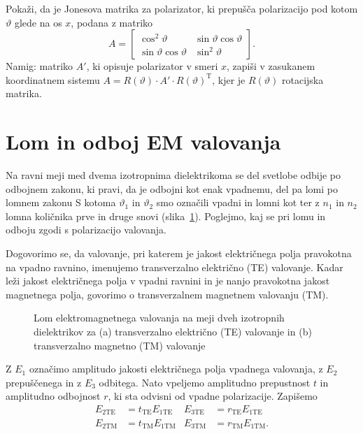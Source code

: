 \begin{definition}
Pokaži, da je Jonesova matrika za polarizator,
ki prepušča polarizacijo pod kotom $\vartheta$ glede na os $x$, podana z matriko
\begin{equation}
A=\left[\begin{array}{cc}
\cos^{2}\vartheta & \sin\vartheta\cos\vartheta\\
\sin\vartheta\cos\vartheta & \sin^{2}\vartheta
\end{array}\right].
\end{equation}
Namig: matriko $A'$, ki opisuje polarizator v smeri $x$, zapiši v zasukanem
koordinatnem sistemu $A=R(\vartheta) \cdot {A'}\cdot R(\vartheta)^\textrm{T}$, 
kjer je $R(\vartheta)$ rotacijska matrika.
\end{definition}

\section{Lom in odboj EM valovanja}
Na ravni meji med dvema izotropnima dielektrikoma se del svetlobe
odbije po odbojnem zakonu, ki pravi, da je odbojni kot enak vpadnemu, 
del pa lomi po lomnem zakonu 
S kotoma $\vartheta_{1}$ in $\vartheta_{2}$ smo označili vpadni in lomni
kot ter z $n_{1}$ in $n_{2}$ lomna količnika prve in druge snovi (slika~\ref{fig:Lom}).
Poglejmo, kaj se pri lomu in odboju zgodi s polarizacijo valovanja.

Dogovorimo se, da valovanje, pri katerem je jakost električnega polja pravokotna 
na vpadno ravnino, imenujemo transverzalno električno (TE) 
valovanje. Kadar leži jakost električnega polja v
vpadni ravnini in je nanjo pravokotna jakost magnetnega polja,
govorimo o transverzalnem magnetnem valovanju (TM).\\
\begin{figure}[h]
\centering {} 
  
\caption{Lom elektromagnetnega valovanja na meji dveh izotropnih dielektrikov za (a)
trans\-ver\-zal\-no električno (TE) valovanje in (b) trans\-ver\-zal\-no magnetno (TM) valovanje}
\label{fig:Lom}
\end{figure}

Z $E_1$ označimo amplitudo jakosti električnega polja vpadnega valovanja, 
z $E_2$ prepuščenega in z $E_3$ odbitega.
Nato vpeljemo amplitudno prepustnost $t$ in amplitudno odbojnost $r$, 
ki sta odvisni od vpadne polarizacije. Zapišemo
\begin{align}
E_{2\mathrm{TE}} & =t_{\mathrm{TE}}E_{1\mathrm{TE}} & E_{3\mathrm{TE}} &=r_{\mathrm{TE}}E_{1\mathrm{TE}}\\
E_{2\mathrm{TM}} & =t_{\mathrm{TM}}E_{1\mathrm{TM}} & E_{3\mathrm{TM}}&=r_{\mathrm{TM}}E_{1\mathrm{TM}}.
\end{align}

